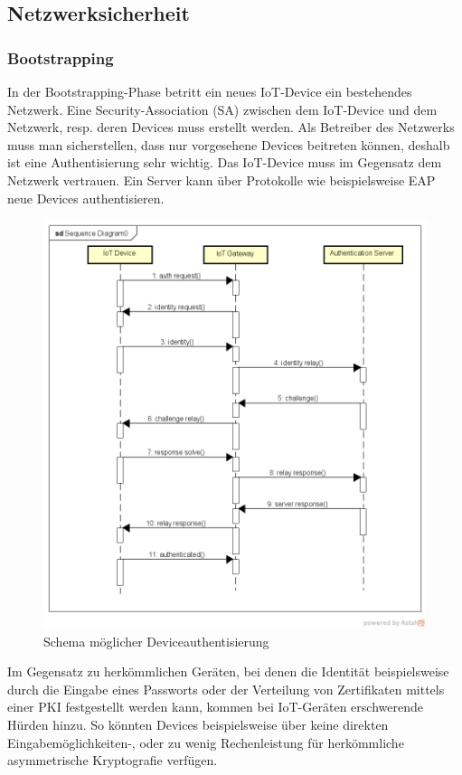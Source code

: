 \subsection{Netzwerksicherheit}
\subsubsection{Bootstrapping}
In der Bootstrapping-Phase betritt ein neues IoT-Device ein bestehendes Netzwerk. Eine Security-Association (SA) zwischen dem IoT-Device und dem Netzwerk, resp. deren Devices muss erstellt werden. Als Betreiber des Netzwerks muss man sicherstellen, dass nur vorgesehene Devices beitreten können, deshalb ist eine Authentisierung sehr wichtig. Das IoT-Device muss im Gegensatz dem Netzwerk vertrauen. Ein Server kann über Protokolle wie beispielsweise EAP neue Devices authentisieren.
\begin{figure}[H]
\centering
\includegraphics[scale=0.6]{../02_Analyse/images/deviceauthentication.png}
\caption{Schema möglicher Deviceauthentisierung}
\end{figure}
Im Gegensatz zu herkömmlichen Geräten, bei denen die Identität beispielsweise durch die Eingabe eines Passworts oder der Verteilung von Zertifikaten mittels einer PKI festgestellt werden kann, kommen bei IoT-Geräten erschwerende Hürden hinzu. \cite{IoTSecurityChallenges} So könnten Devices beispielsweise über keine direkten Eingabemöglichkeiten-, oder zu wenig Rechenleistung für herkömmliche asymmetrische Kryptografie verfügen.

